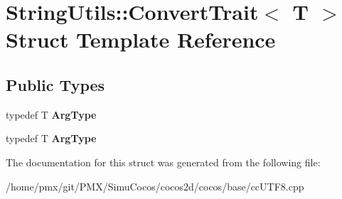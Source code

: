 \hypertarget{structStringUtils_1_1ConvertTrait}{}\section{String\+Utils\+:\+:Convert\+Trait$<$ T $>$ Struct Template Reference}
\label{structStringUtils_1_1ConvertTrait}
\subsection*{Public Types}
\begin{DoxyCompactItemize}
\item 
\mbox{\label{structStringUtils_1_1ConvertTrait_a833d50cf7211aa0b8719e3f736099d3f}} 
typedef T {\bfseries Arg\+Type}
\item 
\mbox{\label{structStringUtils_1_1ConvertTrait_a833d50cf7211aa0b8719e3f736099d3f}} 
typedef T {\bfseries Arg\+Type}
\end{DoxyCompactItemize}


The documentation for this struct was generated from the following file\+:\begin{DoxyCompactItemize}
\item 
/home/pmx/git/\+P\+M\+X/\+Simu\+Cocos/cocos2d/cocos/base/cc\+U\+T\+F8.\+cpp\end{DoxyCompactItemize}

